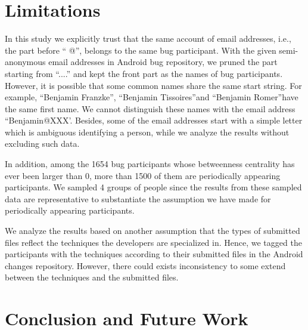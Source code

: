 \documentclass[10pt, conference, compsocconf]{IEEEtran}
\begin{document}

\section{Limitations}
\label{limitation}

In this study we explicitly trust that the same account of email
addresses, i.e., the part before \textquotedblleft
@\textquotedblright, belongs to the same bug participant. With the
given semi-anonymous email addresses in Android bug repository, we
pruned the part starting from \textquotedblleft ....\textquotedblright
and kept the front part as the names of bug participants. However, it
is possible that some common names share the same start string. For
example, \textquotedblleft Benjamin Franzke\textquotedblright,
\textquotedblleft Benjamin Tissoires\textquotedblright  and
\textquotedblleft Benjamin Romer\textquotedblright  have the same
first name. We cannot distinguish these names with the email address
\textquotedblleft Benjamin@XXX'. Besides, some of the email addresses
start with a simple letter which is ambiguous identifying a person,
while we analyze the results without excluding such data.


In addition, among the 1654 bug participants whose betweenness
centrality has ever been larger than 0, more than 1500 of them are
periodically appearing participants. We sampled 4 groups of people
since the results from these sampled data are representative to
substantiate the assumption we have made for periodically appearing
participants.


We analyze the results based on another assumption that the types of
submitted files reflect the techniques the developers are specialized
in. Hence, we tagged the participants with the techniques according to
their submitted files in the Android changes repository. However,
there could exists inconsistency to some extend between the techniques
and the submitted files. 


\section{Conclusion and Future Work}
\label{conclusion}
\end{document}
